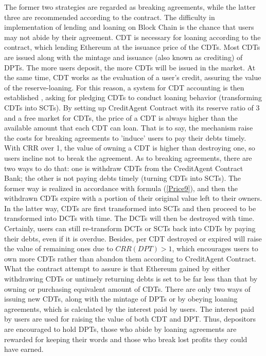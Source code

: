 \documentclass[a4paper, 10pt, conference]{ieeeconf} %
\begin{document}
The former two strategies are regarded as breaking agreements, while the latter three are recommended according to the contract. The difficulty in implementation of lending and loaning on Block Chain is the chance that users may not abide by their agreement. CDT is necessary for loaning according to the contract, which lending Ethereum at the issuance price of the CDTs. Most CDTs are issued along with the mintage and issuance (also known as crediting) of DPTs. The more users deposit, the more CDTs will be issued in the market. At the same time, CDT works as the evaluation of a user's credit, assuring the value of the reserve-loaning. For this reason, a system for CDT accounting is then established , asking for pledging CDTs to conduct loaning behavior (transforming CDTs into SCTs).
By setting up CreditAgent Contract with its reserve ratio of 3 and a free market for CDTs, the price of a CDT is always higher than the available amount that each CDT can loan. That is to say, the mechanism raise the costs for breaking agreements to 'induce' users to pay their debts timely. With CRR over 1, the value of owning a CDT is higher than destroying one, so users incline not to break the agreement. As to breaking agreements, there are two ways to do that: one is withdraw CDTs from the CreditAgent Contract Bank; the other is not paying debts timely (turning CDTs into SCTs). The former way is realized in accordance with formula (\ref{Price9}), and then the withdrawn CDTs expire with a portion of their original value left to their owners. In the latter way, CDTs are first transformed into SCTs and then proceed to be transformed into DCTs with time. The DCTs will then be destroyed with time. Certainly, users can still re-transform DCTs or SCTs back into CDTs by paying their debts, even if it is overdue. Besides, per CDT destroyed or expired will raise the value of remaining ones due to ${CRR(DPT) > 1}$, which encourages users to own more CDTs rather than abandon them according to CreditAgent Contract. What the contract attempt to assure is that Ethereum gained by either withdrawing CDTs or untimely returning debts is set to be far less than that by owning or purchasing equivalent amount of CDTs.
There are only two ways of issuing new CDTs, along with the mintage of DPTs or by obeying loaning agreements, which is calculated by the interest paid by users. The interest paid by users are used for raising the value of both CDT and DPT. Thus, depositors are encouraged to hold DPTs, those who abide by loaning agreements are rewarded for keeping their words and those who break lost profits they could have earned.
\end{document}
